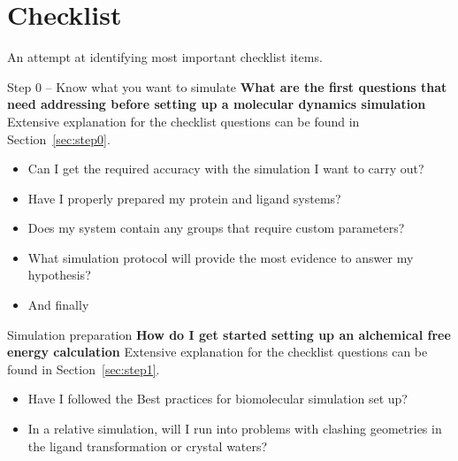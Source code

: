 \documentclass[9pt,bestpractices]{livecoms}
\begin{document}
\section{Checklist}
\label{sec:checklist}
An attempt at identifying most important checklist items.


\begin{Checklists*}[p!]

\begin{checklist}{Step 0 -- Know what you want to simulate }
\textbf{What are the first questions that need addressing before setting up a molecular dynamics simulation}\\
Extensive explanation for the checklist questions can be found in Section~\ref{sec:step0}.
\begin{itemize}
\item Can I get the required accuracy with the simulation I want to carry out?
\item Have I properly prepared my protein and ligand systems?
\item Does my system contain any groups that require custom parameters?
\item What simulation protocol will provide the most evidence to answer my hypothesis?

\item And finally
\end{itemize}
\end{checklist}

\begin{checklist}{Simulation preparation}
\textbf{How do I get started setting up an alchemical free energy calculation}
Extensive explanation for the checklist questions can be found in Section~\ref{sec:step1}.
\begin{itemize}
\item Have I followed the Best practices for biomolecular simulation set up?
\item In a relative simulation, will I run into problems with clashing geometries in the ligand transformation or crystal waters?
\end{itemize}
\end{checklist}
\end{Checklists*}
\end{document}
